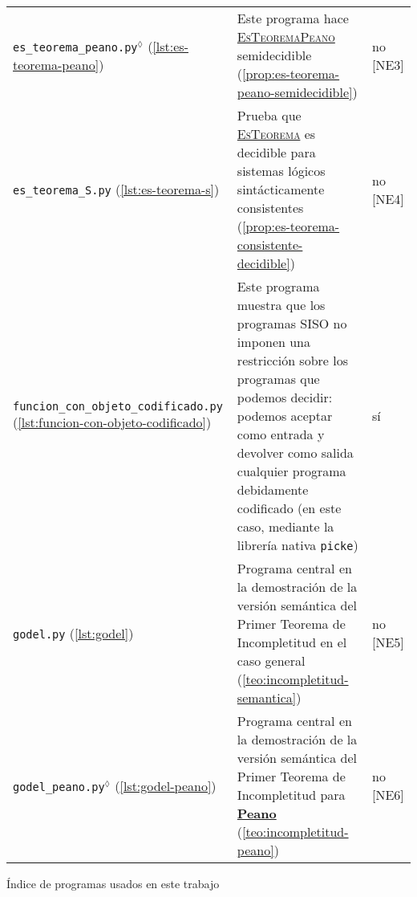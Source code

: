 \begin{tabularx}{\textwidth}{L{0.3} L{0.5} L{0.2}}
\texttt{es\_teorema\_peano.py}$^\lozenge$ \linebreak \small{(\cref{lst:es-teorema-peano})} & Este programa hace \hyperref[prob:es-teorema-peano]{\textsc{EsTeoremaPeano}} semidecidible (\cref{prop:es-teorema-peano-semidecidible}) \vspace{4pt} & no [NE3] \\

\texttt{es\_teorema\_S.py} \linebreak \small{(\cref{lst:es-teorema-s})} & Prueba que \hyperref[prob:es-teorema]{\textsc{EsTeorema}} es decidible para sistemas lógicos sintácticamente consistentes (\cref{prop:es-teorema-consistente-decidible}) \vspace{4pt} & no [NE4] \\

\texttt{funcion\_con\_objeto}\linebreak\texttt{\_codificado.py} \linebreak \small{(\cref{lst:funcion-con-objeto-codificado})} & Este programa muestra que los programas SISO no imponen una restricción sobre los programas que podemos decidir: podemos aceptar como entrada y devolver como salida cualquier programa debidamente codificado (en este caso, mediante la librería nativa \texttt{picke}) \vspace{4pt} & sí \\

\texttt{godel.py} \linebreak \small{(\cref{lst:godel})} & Programa central en la demostración de la versión semántica del Primer Teorema de Incompletitud en el caso general (\cref{teo:incompletitud-semantica}) \vspace{4pt} & no [NE5] \\

\texttt{godel\_peano.py}$^\lozenge$ \linebreak \small{(\cref{lst:godel-peano})} & Programa central en la demostración de la versión semántica del Primer Teorema de Incompletitud para \hyperref[sl:peano]{\textbf{Peano}} (\cref{teo:incompletitud-peano}) \vspace{2pt} & no [NE6] \\

\midrule
\end{tabularx}
\vspace*{-0.2cm}
\begin{tabla}
\caption{Índice de programas usados en este trabajo}
\label{tab:indice-programas}
\end{tabla}
\vspace*{-1cm}

